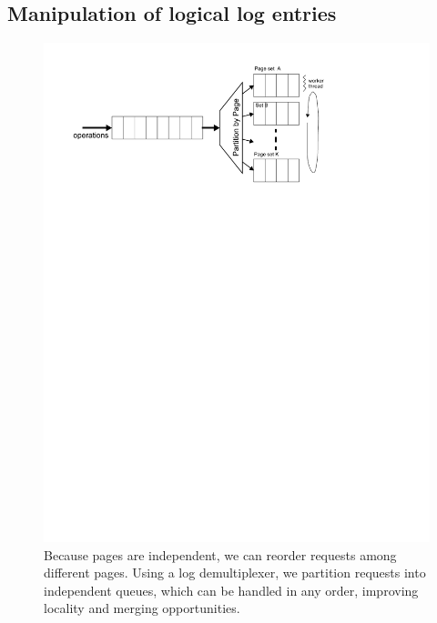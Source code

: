 \documentclass[letterpaper,twocolumn,10pt]{article}
\begin{document}
\subsection{Manipulation of logical log entries}
\label{sec:logging}
\begin{figure}
\includegraphics[width=1\columnwidth]{figs/graph-traversal.pdf}
\vspace{-24pt}
\caption{\sf\label{fig:multiplexor} Because pages are independent, we
can reorder requests among different pages. Using a log demultiplexer,
we partition requests into independent queues, which can be 
handled in any order, improving locality and merging opportunities.}
\end{figure}
\end{document}
